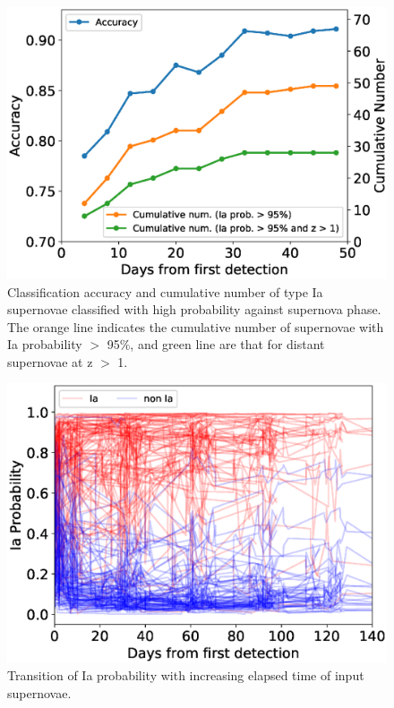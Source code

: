 \documentclass[useamsfonts]{pasj01}
\begin{document}
\begin{figure}[ht]
  \begin{center}
     \includegraphics[width=\columnwidth]{figures/n_observations_SNphase_v200206.eps}
  \end{center}
  \caption{%
  Classification accuracy and cumulative number of type Ia supernovae classified with high probability against supernova phase.
  The orange line indicates the cumulative number of supernovae with Ia probability $>$ 95\%, and green line are that for distant supernovae at z $>$ 1. %
  }%
  \label{fig:n_observations_SNphase}
\end{figure}
%
%
\begin{figure}[ht]
  \begin{center}
     \includegraphics[width=\columnwidth]{figures/n_observations_visualized_Ia_probability_200206.eps}
  \end{center}
  \caption{%
  Transition of Ia probability with increasing elapsed time of input supernovae.
  }%
  \label{fig:visualized_Ia_prob}
\end{figure}
\end{document}

